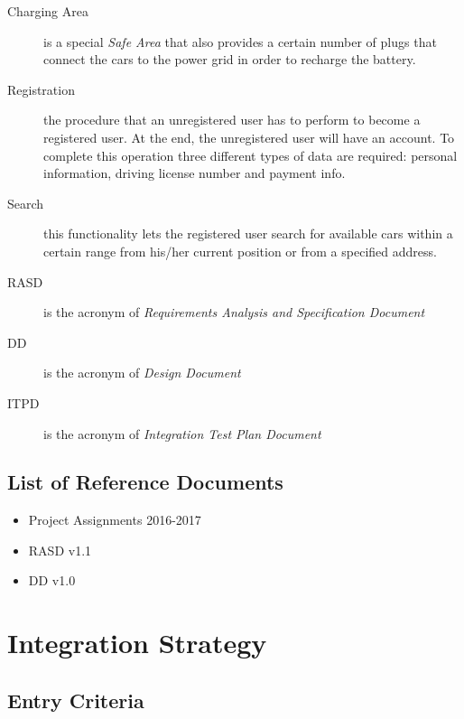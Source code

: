 \documentclass[11pt,a4paper]{report}
\begin{document}
\begin{description}
	\item[Charging Area] is a special \textit{Safe Area} that also provides a certain number of plugs that connect the cars to the power grid in order to recharge the battery.
	\item[Registration] the procedure that an unregistered user has to perform to become a registered user. At the end, the unregistered user will have an account. To complete this operation three different types of data are required: personal information, driving license number and payment info.
	\item[Search] this functionality lets the registered user search for available cars within a certain range from his/her current position or from a specified address.
	\item[RASD] is the acronym of \textit{Requirements Analysis and Specification Document}
	\item[DD] is the acronym of \textit{Design Document}
	\item[ITPD] is the acronym of \textit{Integration Test Plan Document}
\end{description}
\section{List of Reference Documents}
	\begin{itemize}
		\item Project Assignments 2016-2017
		\item RASD v1.1
		\item DD v1.0
	\end{itemize}
\chapter{Integration Strategy}
\section{Entry Criteria}
\end{document}
